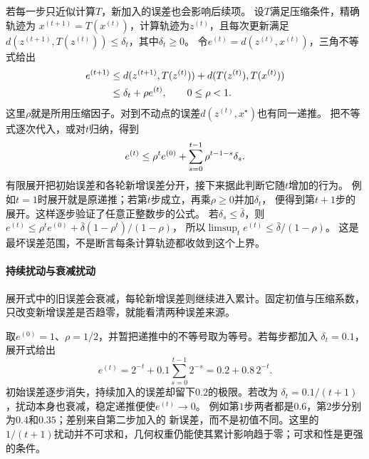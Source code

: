 若每一步只近似计算$T$，新加入的误差也会影响后续项。
设$T$满足压缩条件，精确轨迹为
$x^{(t+1)}=T(x^{(t)})$，计算轨迹为$z^{(t)}$，且每次更新满足
$d(z^{(t+1)},T(z^{(t)}))\leq\delta_t$，其中$\delta_t\geq0$。
令$e^{(t)}=d(z^{(t)},x^{(t)})$，三角不等式给出
\begin{equation}
 \begin{aligned}
 e^{(t+1)}
 &\leq d(z^{(t+1)},T(z^{(t)}))
       +d(T(z^{(t)}),T(x^{(t)}))\\
 &\leq\delta_t+\rho e^{(t)},\qquad 0\leq\rho<1.
 \end{aligned}
\label{eq:analysis-perturbed-distance-recursion}
\begingroup
\makeatletter
\let\label\ltx@label
\label{eq:prelim-perturbed-recurrence}
\endgroup
\end{equation}
这里$\rho$就是所用压缩因子。对到不动点的误差$d(z^{(t)},x^\star)$也有同一递推。
把不等式逐次代入，或对$t$归纳，得到
\begin{equation}
 e^{(t)}
 \leq \rho^t e^{(0)}
       +\sum_{s=0}^{t-1}\rho^{t-1-s}\delta_s.
\label{eq:analysis-perturbed-distance-unrolling}
\begingroup
\makeatletter
\let\label\ltx@label
\label{eq:prelim-unrolled-recurrence}
\endgroup
\end{equation}
有限展开把初始误差和各轮新增误差分开，接下来据此判断它随$t$增加的行为。
例如$t=1$时展开就是原递推；若第$t$步成立，再乘$\rho\geq0$并加$\delta_t$，
便得到第$t+1$步的展开。这样逐步验证了任意正整数步的公式。
若$\delta_s\leq\bar\delta$，则
$e^{(t)}\leq\rho^t e^{(0)}+\bar\delta(1-\rho^t)/(1-\rho)$，
所以$\limsup_t e^{(t)}\leq\bar\delta/(1-\rho)$。
这是最坏误差范围，不是断言每条计算轨迹都收敛到这个上界。

\paragraph{持续扰动与衰减扰动}

展开式中的旧误差会衰减，每轮新增误差则继续进入累计。固定初值与压缩系数，只改变新增误差是否趋零，就能看清两种误差来源。
\begin{example}[持续扰动与衰减扰动]
\label{ex:prelim-recurring-perturbations}
取$e^{(0)}=1$、$\rho=1/2$，并暂把递推中的不等号取为等号。若每步都加入
$\delta_t=0.1$，展开式给出
\[
 e^{(t)}=2^{-t}+0.1\sum_{s=0}^{t-1}2^{-s}
        =0.2+0.8\,2^{-t}.
\]
初始误差逐步消失，持续加入的误差却留下$0.2$的极限。若改为
$\delta_t=0.1/(t+1)$，扰动本身也衰减，稳定递推便使$e^{(t)}\to0$。
例如第$1$步两者都是$0.6$，第$2$步分别为$0.4$和$0.35$；差别来自第二步加入的
新误差，而不是初值不同。这里的$1/(t+1)$扰动并不可求和，几何权重仍能使其累计影响趋于零；可求和性是更强的条件。
\end{example}

